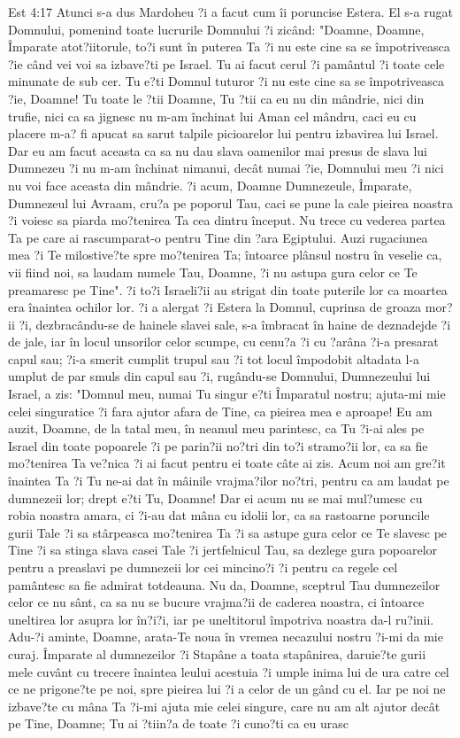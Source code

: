 Est 4:17  Atunci s-a dus Mardoheu ?i a facut cum îi poruncise Estera. El s-a rugat Domnului, pomenind toate lucrurile Domnului ?i zicând: "Doamne, Doamne, Împarate atot?iitorule, to?i sunt în puterea Ta ?i nu este cine sa se împotriveasca ?ie când vei voi sa izbave?ti pe Israel. Tu ai facut cerul ?i pamântul ?i toate cele minunate de sub cer. Tu e?ti Domnul tuturor ?i nu este cine sa se împotriveasca ?ie, Doamne! Tu toate le ?tii Doamne, Tu ?tii ca eu nu din mândrie, nici din trufie, nici ca sa jignesc nu m-am închinat lui Aman cel mândru, caci eu cu placere m-a? fi apucat sa sarut talpile picioarelor lui pentru izbavirea lui Israel. Dar eu am facut aceasta ca sa nu dau slava oamenilor mai presus de slava lui Dumnezeu ?i nu m-am închinat nimanui, decât numai ?ie, Domnului meu ?i nici nu voi face aceasta din mândrie. ?i acum, Doamne Dumnezeule, Împarate, Dumnezeul lui Avraam, cru?a pe poporul Tau, caci se pune la cale pieirea noastra ?i voiesc sa piarda mo?tenirea Ta cea dintru început. Nu trece cu vederea partea Ta pe care ai rascumparat-o pentru Tine din ?ara Egiptului. Auzi rugaciunea mea ?i Te milostive?te spre mo?tenirea Ta; întoarce plânsul nostru în veselie ca, vii fiind noi, sa laudam numele Tau, Doamne, ?i nu astupa gura celor ce Te preamaresc pe Tine". ?i to?i Israeli?ii au strigat din toate puterile lor ca moartea era înaintea ochilor lor. ?i a alergat ?i Estera la Domnul, cuprinsa de groaza mor?ii ?i, dezbracându-se de hainele slavei sale, s-a îmbracat în haine de deznadejde ?i de jale, iar în locul unsorilor celor scumpe, cu cenu?a ?i cu ?arâna ?i-a presarat capul sau; ?i-a smerit cumplit trupul sau ?i tot locul împodobit altadata l-a umplut de par smuls din capul sau ?i, rugându-se Domnului, Dumnezeului lui Israel, a zis: "Domnul meu, numai Tu singur e?ti Împaratul nostru; ajuta-mi mie celei singuratice ?i fara ajutor afara de Tine, ca pieirea mea e aproape! Eu am auzit, Doamne, de la tatal meu, în neamul meu parintesc, ca Tu ?i-ai ales pe Israel din toate popoarele ?i pe parin?ii no?tri din to?i stramo?ii lor, ca sa fie mo?tenirea Ta ve?nica ?i ai facut pentru ei toate câte ai zis. Acum noi am gre?it înaintea Ta ?i Tu ne-ai dat în mâinile vrajma?ilor no?tri, pentru ca am laudat pe dumnezeii lor; drept e?ti Tu, Doamne! Dar ei acum nu se mai mul?umesc cu robia noastra amara, ci ?i-au dat mâna cu idolii lor, ca sa rastoarne poruncile gurii Tale ?i sa stârpeasca mo?tenirea Ta ?i sa astupe gura celor ce Te slavesc pe Tine ?i sa stinga slava casei Tale ?i jertfelnicul Tau, sa dezlege gura popoarelor pentru a preaslavi pe dumnezeii lor cei mincino?i ?i pentru ca regele cel pamântesc sa fie admirat totdeauna. Nu da, Doamne, sceptrul Tau dumnezeilor celor ce nu sânt, ca sa nu se bucure vrajma?ii de caderea noastra, ci întoarce uneltirea lor asupra lor în?i?i, iar pe uneltitorul împotriva noastra da-l ru?inii. Adu-?i aminte, Doamne, arata-Te noua în vremea necazului nostru ?i-mi da mie curaj. Împarate al dumnezeilor ?i Stapâne a toata stapânirea, daruie?te gurii mele cuvânt cu trecere înaintea leului acestuia ?i umple inima lui de ura catre cel ce ne prigone?te pe noi, spre pieirea lui ?i a celor de un gând cu el. Iar pe noi ne izbave?te cu mâna Ta ?i-mi ajuta mie celei singure, care nu am alt ajutor decât pe Tine, Doamne; Tu ai ?tiin?a de toate ?i cuno?ti ca eu urasc 